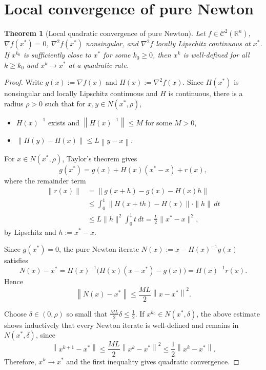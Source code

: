 \documentclass[11pt,a4paper]{report}
\theoremstyle{plain}
\newtheorem{theorem}{Theorem}[chapter]
\theoremstyle{definition}
\newcommand{\R}{\mathbb{R}}
\newcommand{\norm}[1]{\left\lVert#1\right\rVert}
\newcommand{\grad}{\nabla}
\newcommand{\hess}{\nabla^{2}}
\begin{document}
\section{Local convergence of pure Newton}

\begin{theorem}[Local quadratic convergence of pure Newton]\label{thm:newton-local}
Let $f\in\mathcal{C}^{2}(\R^{n})$, $\grad f(x^{*})=0$, $\hess f(x^{*})$ nonsingular,
and $\hess f$ locally Lipschitz continuous at $x^{*}$. If $x^{k_{0}}$ is sufficiently
close to $x^{*}$ for some $k_{0}\ge 0$, then $x^{k}$ is well-defined for all
$k\ge k_{0}$ and $x^{k}\to x^{*}$ at a quadratic rate.
\end{theorem}
\begin{proof}
  Write $g(x):=\grad f(x)$ and $H(x):=\hess f(x)$. Since $H(x^{*})$ is nonsingular and locally Lipschitz continuous and $H$ is continuous,
  there is a radius $\rho>0$ such that for $x, y \in N(x^{*},\rho)$,
  \begin{itemize}
    \item $H(x)^{-1}$ exists and $\norm{H(x)^{-1}}\le M$ for some $M>0$,
    \item $\norm{H(y)-H(x)}\le L\norm{y-x}$.
  \end{itemize}
  For $x\in N(x^{*},\rho)$, Taylor's theorem gives
  \[
    g(x^{*})=g(x)+H(x)(x^{*}-x)+r(x),
  \]
  where the remainder term
  \begin{align*}
    \|r(x)\|
    &= \|g(x + h) - g(x) - H(x)h\| \\
    &\leq \int_{0}^1 \|H(x + th) - H(x)\|\cdot\|h\| \, dt \\
    &\leq L\|h\|^2\int_{0}^1 t \, dt = \frac{L}{2}\|x^* - x\|^2,
  \end{align*}
  by Lipschitz and $h := x^* - x$.


  Since $g(x^{*})=0$, the pure Newton iterate
  $N(x):=x-H(x)^{-1}g(x)$ satisfies
  \[
    N(x)-x^{*}
    =H(x)^{-1}\bigl(H(x)(x-x^{*})-g(x)\bigr)
    =H(x)^{-1}r(x).
  \]
  Hence
  \[
    \norm{N(x)-x^{*}}
    \le \frac{ML}{2}\norm{x-x^{*}}^{2}.
  \]

  Choose $\delta\in(0,\rho)$ so small that
  $\frac{ML}{2}\delta\le\frac12$. If $x^{k_{0}}\in N(x^{*},\delta)$, the above
  estimate shows inductively that every Newton iterate is well-defined and
  remains in $N(x^{*},\delta)$, since
  \[
    \norm{x^{k+1}-x^{*}}
    \le \frac{ML}{2}\norm{x^{k}-x^{*}}^{2}
    \le \frac12\norm{x^{k}-x^{*}}.
  \]
  Therefore, $x^{k}\to x^{*}$ and the first inequality gives quadratic convergence.
\end{proof}
\end{document}
